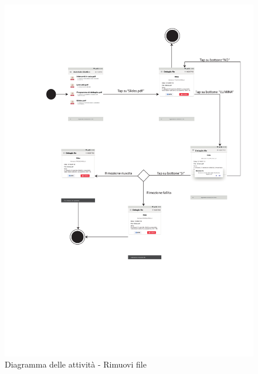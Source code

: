 \begin{figure}
	\centering
	\includegraphics[width=6in]{imgs/gruppo1/activity_diagrams/AD17_rimuovi_file.pdf}
	\caption{Diagramma delle attività - Rimuovi file}
	\label{diag:rimuoviFileAD}
\end{figure}

\clearpage
